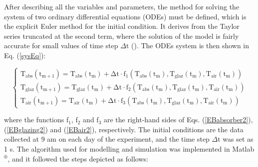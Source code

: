 After describing all the variables and parameters, the method for solving the system of two ordinary differential equations (ODEs) must be defined, which is the explicit Euler method for the initial condition. It derives from the Taylor series truncated at the second term, where the solution of the model is fairly accurate for small values of time step $\Delta \mathrm{t}$ (\cite{Hoffman2001}). The ODEs system is then shown in Eq. (\ref{sysEq}):

\vspace{-0.75cm}
\begin{equation}
\left\{ \begin{array}{l}
\mathrm{{T_{abs}}({t_{m + 1}}) = {T_{abs}}({t_m}) + \Delta t \cdot {f_1}({T_{abs}}({t_m}),{T_{glaz}}({t_m}),{T_{air}}({t_m}))}\\
\mathrm{{T_{glaz}}({t_{m + 1}}) = {T_{glaz}}({t_m}) + \Delta t \cdot {f_2}({T_{abs}}({t_m}),{T_{glaz}}({t_m}),{T_{air}}({t_m}))}\\
\mathrm{{T_{air}}({t_{m + 1}}) = {T_{air}}({t_m}) + \Delta t \cdot {f_3}({T_{abs}}({t_m}),{T_{glaz}}({t_m}),{T_{air}}({t_m}))      }
\end{array} \right.
\label{sysEq}
\end{equation}

\noindent where the functions f$_1$, f$_2$ and f$_3$ are the right-hand sides of Eqs. (\ref{EBabsorber2}), (\ref{EBglazing2}) and (\ref{EBair2}), respectively. The initial conditions are the data collected at 9 am on each day of the experiment, and the time step $\Delta \mathrm{t}$ was set as 1 s. The algorithm used for modelling and simulation was implemented in Matlab$^{\circledR}$, and it followed the steps depicted as follows:






